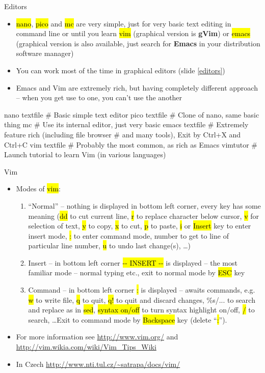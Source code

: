 \documentclass[compress, ucs, xelatex, 11pt, xcolor=svgnames,
  hyperref={
    bookmarks=true,
    unicode=true,
    colorlinks=true,
    pdftitle={Linux, command line and MetaCentrum},
    plainpages=false,
    pdfauthor={Vojtech Zeisek},
    pdfsubject={Course about use of Linux command line, writing shell scripts and using MetaCentrum of CESNET},
    pdfcreator={XeLaTeX},
    pdfkeywords={Linux, GNU, BASH, shell, command line, MetaCentrum},
    linkcolor=Red,
    anchorcolor=Blue,
    citecolor=Purple,
    filecolor=DodgerBlue,
    menucolor=DarkOrchid,
    urlcolor=DeepSkyBlue,
    pdftex},
  url={hyphens, lowtilde} %
  ]{beamer}
\renewcommand{\texttt}[1]{\hl{\ttfamily #1}}
\begin{document}
\begin{frame}[fragile]{Editors}
\begin{itemize}
 \item \texttt{nano}, \texttt{pico} and \texttt{mc} are very simple, just for very basic text editing in command line or until you learn \texttt{vim} (graphical version is \textbf{gVim}) or \texttt{emacs} (graphical version is also available, just search for \textbf{Emacs} in your distribution software manager)
 \item You can work most of the time in graphical editors (slide \ref{editors})
 \item Emacs and Vim are extremely rich, but having completely different approach -- when you get use to one, you can't use the another
\end{itemize}
  \begin{bashcode}
    nano textfile # Basic simple text editor
    pico textfile # Clone of nano, same basic thing
    mc # Use its internal editor, just very basic
    emacs textfile # Extremely feature rich (including file browser
                   # and many tools), Exit by Ctrl+X and Ctrl+C
    vim textfile # Probably the most common, as rich as Emacs
    vimtutor # Launch tutorial to learn Vim (in various languages)
   \end{bashcode}
\end{frame}

\begin{frame}{Vim}
\begin{itemize}
 \item Modes of \texttt{vim}:
  \begin{enumerate}
   \item ``Normal'' -- nothing is displayed in bottom left corner, every key has some meaning (\texttt{dd} to cut current line, \texttt{r} to replace character below cursor, \texttt{v} for selection of text, \texttt{y} to copy, \texttt{x} to cut, \texttt{p} to paste, \texttt{i} or \texttt{Insert} key to enter insert mode, \texttt{:} to enter command mode, number to get to line of particular line number, \texttt{u} to undo last change(s), \ldots)
   \item Insert -- in bottom left corner \texttt{-{-} INSERT {-}-} is displayed -- the most familiar mode -- normal typing etc., exit to normal mode by \texttt{ESC} key
   \item Command -- in bottom left corner \texttt{:} is displayed -- awaits commands, e.g. \texttt{w} to write file, \texttt{q} to quit, \texttt{q!} to quit and discard changes, \%s/... to search and replace as in \texttt{sed}, \texttt{syntax on/off} to turn syntax highlight on/off, \texttt{/} to search, \ldots Exit to command mode by \texttt{Backspace} key (delete ``\texttt{:}'').
  \end{enumerate}
  \item For more information see \url{http://www.vim.org/} and \url{http://vim.wikia.com/wiki/Vim_Tips_Wiki}
  \item In Czech \url{http://www.nti.tul.cz/~satrapa/docs/vim/}
\end{itemize}
\end{frame}
\end{document}
